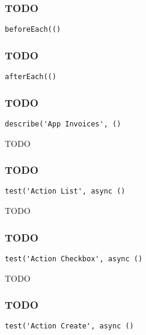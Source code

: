 \documentclass[a4paper]{article}
\begin{document}
\hypertarget{toc666}{}
\subsubsection{TODO}

\begin{lstlisting}
beforeEach(()
\end{lstlisting}

\hypertarget{toc667}{}
\subsubsection{TODO}

\begin{lstlisting}
afterEach(()
\end{lstlisting}

\hypertarget{toc668}{}
\subsubsection{TODO}

\begin{lstlisting}
describe('App Invoices', ()
\end{lstlisting}

TODO

\hypertarget{toc669}{}
\subsubsection{TODO}

\begin{lstlisting}
test('Action List', async ()
\end{lstlisting}

TODO

\hypertarget{toc670}{}
\subsubsection{TODO}

\begin{lstlisting}
test('Action Checkbox', async ()
\end{lstlisting}

TODO

\hypertarget{toc671}{}
\subsubsection{TODO}

\begin{lstlisting}
test('Action Create', async ()
\end{lstlisting}
\end{document}
